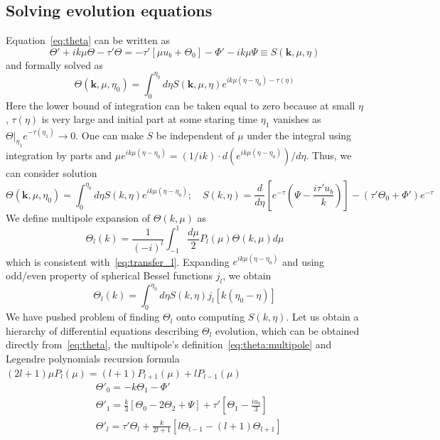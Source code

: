 \documentclass[12pt]{extarticle}
\numberwithin{problem}{section}
\numberwithin{theorem}{section}
\begin{document}
	\subsection{Solving evolution equations}
	Equation~\ref{eq:theta} can be written as
	\begin{equation}
		\Theta' + ik\mu\Theta - \tau'\Theta = -\tau'[\mu u_b + \Theta_0] - \Phi' - ik\mu\Psi \equiv S(\mathbf{k}, \mu, \eta)
	\end{equation}
	and formally solved as
	\begin{equation}
		\Theta(\mathbf{k}, \mu, \eta_0) = \int_0^{\eta_0} d\eta S(\mathbf{k}, \mu, \eta) e^{ik\mu(\eta - \eta_0) - \tau(\eta)}
	\end{equation}
	Here the lower bound of integration can be taken equal to zero because at small $\eta$, $\tau(\eta)$ is very large and initial part at some staring time $\eta_1$ vanishes as $\Theta|_{\eta_1}e^{-\tau(\eta_1)}\to 0$. One can make $S$ be independent of $\mu$ under the integral using integration by parts and $\mu e^{ik\mu(\eta-\eta_0)} = (1/ik)\cdot d(e^{ik\mu(\eta-\eta_0)})/d\eta$. Thus, we can consider solution
	\begin{equation}
		\Theta(\mathbf{k}, \mu, \eta_0) = \int_0^{\eta_0} d\eta S(k, \eta) e^{ik\mu(\eta - \eta_0)};\quad S(k, \eta) = \frac{d}{d\eta}\left[e^{-\tau}\left(\Psi - \frac{i\tau'u_b}{k}\right)\right] - (\tau'\Theta_0 + \Phi')e^{-\tau}
	\end{equation}
	We define multipole expansion of $\Theta(k, \mu)$ as 
	\begin{equation}
		\label{eq:theta:multipole}
		\Theta_l(k) = \frac{1}{(-i)^l}\int^1_{-1}\frac{d\mu}{2}P_l(\mu)\Theta(k, \mu) d\mu
	\end{equation}
	which is consistent with~\ref{eq:transfer_l}. Expanding $e^{ik\mu(\eta - \eta_0)}$ and using odd/even property of spherical Bessel functions $j_l$, we obtain
	\begin{equation}
		\Theta_l(k) = \int_0^{\eta_0}d\eta S(k, \eta) j_l[k(\eta_0 - \eta)]
	\end{equation}
	We have pushed problem of finding $\Theta_l$ onto computing $S(k, \eta)$. Let us obtain a hierarchy of differential equations describing $\Theta_l$ evolution, which can be obtained directly from~\ref{eq:theta}, the multipole's definition~\ref{eq:theta:multipole} and Legendre polynomials recursion formula $(2l + 1)\mu P_l(\mu) = (l + 1)P_{l + 1}(\mu) + lP_{l - 1}(\mu)$
	\begin{align}
		& \Theta'_0 = -k\Theta_1 - \Phi'\\
		& \Theta'_1 = \frac{k}{3}\left[\Theta_0 - 2\Theta_2 + \Psi\right] + \tau'\left[\Theta_1 - \frac{iu_b}{3}\right] \\
		\label{eq:theta:high_l}
		& \Theta'_l = \tau'\Theta_l + \frac{k}{2l + 1}\left[l\Theta_{l - 1} - (l + 1)\Theta_{l + 1}\right]
	\end{align}
	
\end{document}
